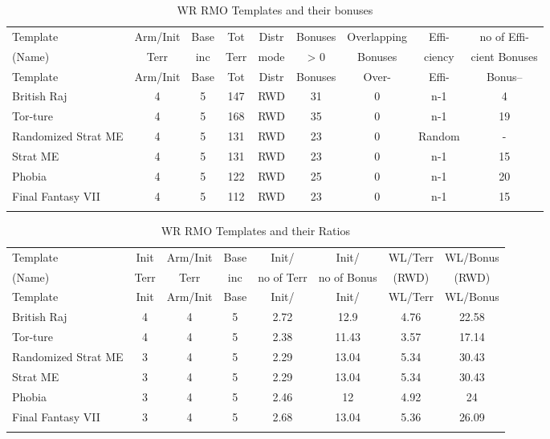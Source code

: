 \scriptsize
\begin{longtable}{|l|c|c|c|c|c|c|c|c|}
\hline
\rowcolor{Baby_Blue}
Template & Arm/\newline Init & Base & Tot & Distr & Bonuses & Overlapping & Effi- & no of Effi- \\ 
\rowcolor{Baby_Blue}
(Name)   & Terr & inc & Terr & mode & > 0 & Bonuses & ciency & cient Bonuses \\ \hline\hline
\endfirsthead
\hline
\rowcolor{Baby_Blue}
Template & Arm/\newline Init & Base & Tot & Distr & Bonuses & Over- & Effi- & Bonus– \\ \hline\hline
\endhead
British Raj & 4 & 5 & 147 & RWD & 31 & 0 & n-1 & 4 \\ 
Tor-ture & 4 & 5 & 168 & RWD & 35 & 0 & n-1 & 19 \\ \hline
Randomized Strat ME & 4 & 5 & 131 & RWD & 23 & 0 & Random & - \\ 
Strat ME & 4 & 5 & 131 & RWD & 23 & 0 & n-1 & 15 \\ 
Phobia & 4 & 5 & 122 & RWD & 25 & 0 & n-1 & 20 \\ 
Final Fantasy VII & 4 & 5 & 112 & RWD & 23 & 0 & n-1 & 15 \\ \hline
\caption{WR RMO Templates and their bonuses}
\label{wr_rmo_templates_bonuses}
\end{longtable}
\normalsize


\scriptsize
\begin{longtable}{|l|c|c|c|c|c|c|c|}
\hline
\rowcolor{Baby_Blue}
Template & Init & Arm/\newline Init & Base & Init/ & Init/ & WL/\newline Terr & WL/\newline Bonus \\ 
\rowcolor{Baby_Blue}
(Name)   & Terr & Terr             & inc  & no of Terr  & no of Bonus & (RWD) & (RWD) \\ \hline\hline
\endfirsthead
\hline
\rowcolor{Baby_Blue}
Template & Init & Arm/\newline Init & Base & Init/ & Init/ & WL/\newline Terr & WL/\newline Bonus \\ \hline\hline
\endhead
British Raj           & 4 & 4 & 5 & 2.72 & 12.9  & 4.76 & 22.58 \\ 
Tor-ture              & 4 & 4 & 5 & 2.38 & 11.43 & 3.57 & 17.14 \\ \hline
Randomized Strat ME   & 3 & 4 & 5 & 2.29 & 13.04 & 5.34 & 30.43 \\ 
Strat ME              & 3 & 4 & 5 & 2.29 & 13.04 & 5.34 & 30.43 \\ 
Phobia                & 3 & 4 & 5 & 2.46 & 12    & 4.92 & 24    \\ 
Final Fantasy VII     & 3 & 4 & 5 & 2.68 & 13.04 & 5.36 & 26.09 \\ \hline
\caption{WR RMO Templates and their Ratios}
\label{wr_rmo_template_ratios}
\end{longtable}
\normalsize

